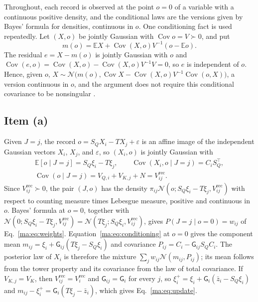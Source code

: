 \documentclass[11pt]{article}
\theoremstyle{definition}
\theoremstyle{remark}
\newcommand{\E}{\mathbb E}
\newcommand{\Gauss}{\mathcal N}
\newcommand{\Vrec}{V^{\mathrm{rec}}}
\newcommand{\G}{\mathsf G}
\newcommand{\Cov}{\operatorname{Cov}}
\begin{document}
Throughout, each record is observed at the point $o=0$ of a variable with a continuous positive density, and the conditional laws are the versions given by Bayes' formula for densities, continuous in $o$. One conditioning fact is used repeatedly. Let $(X,o)$ be jointly Gaussian with $\Cov o=V\succ0$, and put
\begin{equation}
m(o)=\E X+\Cov(X,o)V^{-1}(o-\E o).
\label{ma:eq:conditioning}
\end{equation}
The residual $e=X-m(o)$ is jointly Gaussian with $o$ and $\Cov(e,o)=\Cov(X,o)-\Cov(X,o)V^{-1}V=0$, so $e$ is independent of $o$. Hence, given $o$, $X\sim\Gauss\bigl(m(o),\Cov X-\Cov(X,o)V^{-1}\Cov(o,X)\bigr)$, a version continuous in $o$, and the argument does not require this conditional covariance to be nonsingular \citep[Sec.~2.3.1]{Bishop2006}.

\subsection{Item (a)}
\label{ma:app:item1}

Given $J=j$, the record $o=S_QX_i-TX_j+\varepsilon$ is an affine image of the independent Gaussian vectors $X_i$, $X_j$, and $\varepsilon$, so $(X_i,o)$ is jointly Gaussian with
\[
\begin{gathered}
\E[o\mid J=j]=S_Q\xi_i-T\xi_j,\qquad
\Cov(X_i,o\mid J=j)=C_iS_Q^\top,\\
\Cov(o\mid J=j)=V_{Q,i}+V_{K,j}+N=\Vrec_{ij}.
\end{gathered}
\]
Since $\Vrec_{ij}\succ0$, the pair $(J,o)$ has the density $\pi_{ij}\Gauss(o;S_Q\xi_i-T\xi_j,\Vrec_{ij})$ with respect to counting measure times Lebesgue measure, positive and continuous in $o$. Bayes' formula at $o=0$, together with $\Gauss(0;S_Q\xi_i-T\xi_j,\Vrec_{ij})=\Gauss(T\xi_j;S_Q\xi_i,\Vrec_{ij})$, gives $P(J=j\mid o=0)=w_{ij}$ of Eq.~\eqref{ma:eq:weights}. Equation~\eqref{ma:eq:conditioning} at $o=0$ gives the component mean $m_{ij}=\xi_i+\G_{ij}(T\xi_j-S_Q\xi_i)$ and covariance $P_{ij}=C_i-\G_{ij}S_QC_i$. The posterior law of $X_i$ is therefore the mixture $\sum_jw_{ij}\Gauss(m_{ij},P_{ij})$; its mean follows from the tower property and its covariance from the law of total covariance. If $V_{K,j}=V_K$, then $\Vrec_{ij}=\Vrec_i$ and $\G_{ij}=\G_i$ for every $j$, so $\xi_i^+=\xi_i+\G_i(\bar z_i-S_Q\xi_i)$ and $m_{ij}-\xi_i^+=\G_i(T\xi_j-\bar z_i)$, which gives Eq.~\eqref{ma:eq:update}.
\end{document}
